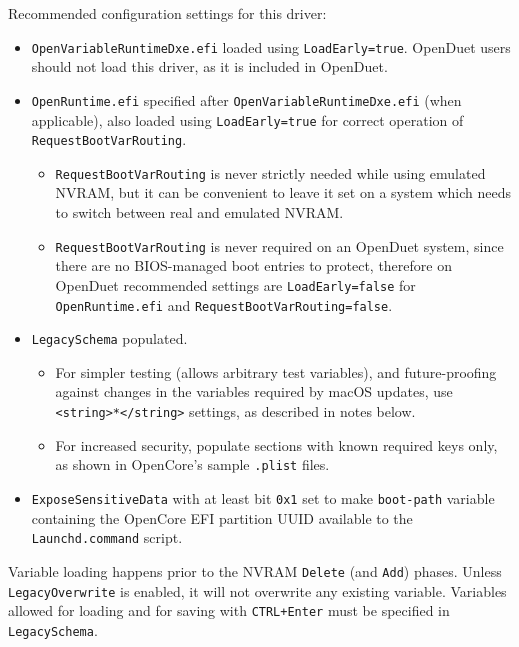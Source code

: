 \documentclass[]{article}
\providecommand{\tightlist}{%
  \setlength{\itemsep}{0pt}\setlength{\parskip}{0pt}}
\begin{document}
Recommended configuration settings for this driver:

\begin{itemize}
\tightlist
  \item \texttt{OpenVariableRuntimeDxe.efi} loaded using \texttt{LoadEarly=true}. OpenDuet users
  should not load this driver, as it is included in OpenDuet.
  \item \texttt{OpenRuntime.efi} specified after \texttt{OpenVariableRuntimeDxe.efi} (when applicable),
  also loaded using \texttt{LoadEarly=true} for correct operation of \texttt{RequestBootVarRouting}.
  \begin{itemize}
  \tightlist
    \item \texttt{RequestBootVarRouting} is never strictly needed while using emulated NVRAM, but
    it can be convenient to leave it set on a system which needs to switch between real and emulated NVRAM.
    \item \texttt{RequestBootVarRouting} is never required on an OpenDuet system, since there are
    no BIOS-managed boot entries to protect, therefore on OpenDuet recommended settings are
    \texttt{LoadEarly=false} for \texttt{OpenRuntime.efi} and \texttt{RequestBootVarRouting=false}.
  \end{itemize}
  \item \texttt{LegacySchema} populated.
  \begin{itemize}
  \tightlist
    \item For simpler testing (allows arbitrary test variables), and future-proofing against
    changes in the variables required by macOS updates, use \texttt{<string>*</string>} settings, as
    described in notes below.
    \item For increased security, populate sections with known required keys only, as shown in OpenCore's
    sample \texttt{.plist} files.
  \end{itemize}
  \item \texttt{ExposeSensitiveData} with at least bit \texttt{0x1} set to make \texttt{boot-path}
  variable containing the OpenCore EFI partition UUID available to the \texttt{Launchd.command} script.
\end{itemize}

Variable loading happens prior to the NVRAM \texttt{Delete} (and \texttt{Add}) phases. Unless
\texttt{LegacyOverwrite} is enabled, it will not overwrite any existing variable.
Variables allowed for loading and for saving with \texttt{CTRL+Enter} must be specified in \texttt{LegacySchema}.
\end{document}
